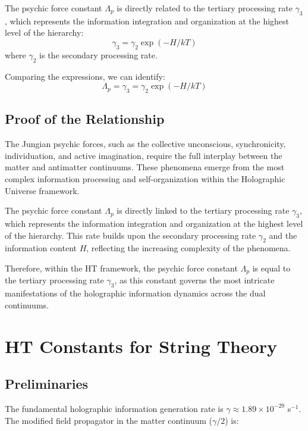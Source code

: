 \documentclass{article}
\theoremstyle{plain}
\theoremstyle{definition}
\theoremstyle{remark}
\begin{document}
The psychic force constant $\Lambda_p$ is directly related to the tertiary processing rate $\gamma_3$, which represents the information integration and organization at the highest level of the hierarchy:
\begin{equation}
\gamma_3 = \gamma_2\exp(-H/kT)
\end{equation}
where $\gamma_2$ is the secondary processing rate.

Comparing the expressions, we can identify:
\begin{equation}
\Lambda_p = \gamma_3 = \gamma_2\exp(-H/kT)
\end{equation}

\subsection{Proof of the Relationship}

The Jungian psychic forces, such as the collective unconscious, synchronicity, individuation, and active imagination, require the full interplay between the matter and antimatter continuums. These phenomena emerge from the most complex information processing and self-organization within the Holographic Universe framework.

The psychic force constant $\Lambda_p$ is directly linked to the tertiary processing rate $\gamma_3$, which represents the information integration and organization at the highest level of the hierarchy. This rate builds upon the secondary processing rate $\gamma_2$ and the information content $H$, reflecting the increasing complexity of the phenomena.

Therefore, within the HT framework, the psychic force constant $\Lambda_p$ is equal to the tertiary processing rate $\gamma_3$, as this constant governs the most intricate manifestations of the holographic information dynamics across the dual continuums.

\section{HT Constants for String Theory}

\subsection{Preliminaries}

The fundamental holographic information generation rate is $\gamma \approx 1.89 \times 10^{-29}$ s$^{-1}$. The modified field propagator in the matter continuum ($\gamma/2$) is:
\end{document}
